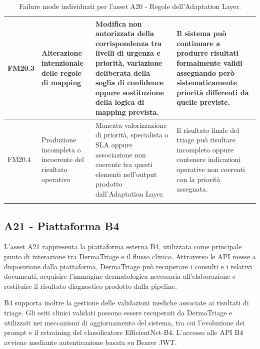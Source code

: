 {\begin{xltabular}{\textwidth}{
    >{\raggedright\arraybackslash}p{1.1cm}
    >{\raggedright\arraybackslash}p{3cm}
    >{\raggedright\arraybackslash}p{5cm}
    X
}
        \midrule

        FM20.3 \hypertarget{fm20-3}{} &
        Alterazione intenzionale delle regole di mapping &
        Modifica non autorizzata della corrispondenza tra livelli di
        urgenza e priorità, variazione deliberata della soglia di
        confidence oppure sostituzione della logica di mapping prevista. &
        Il sistema può continuare a produrre risultati formalmente validi
        assegnando però sistematicamente priorità differenti da quelle
        previste. \\

        \midrule


        FM20.4 \hypertarget{fm20-4}{} &
        Produzione incompleta o incoerente del risultato operativo &
        Mancata valorizzazione di priorità, specialista o SLA oppure
        associazione non coerente tra questi elementi nell'output
        prodotto dall'Adaptation Layer. &
        Il risultato finale del triage può risultare incompleto oppure
        contenere indicazioni operative non coerenti con la priorità
        assegnata. \\

        \bottomrule

    \caption{Failure mode individuati per l'asset A20 - Regole dell'Adaptation Layer.}
    \label{tab:a20-failure-modes}
\end{xltabular}
}


\subsection{A21 - Piattaforma B4}
L'asset A21 rappresenta la piattaforma esterna B4, utilizzata come principale punto di interazione tra DermaTriage e il flusso clinico. Attraverso le API messe a disposizione dalla piattaforma, DermaTriage può recuperare i consulti e i relativi documenti, acquisire l'immagine dermatologica necessaria all'elaborazione e restituire il risultato diagnostico prodotto dalla pipeline.

B4 supporta inoltre la gestione delle validazioni mediche associate ai risultati di triage. Gli esiti clinici validati possono essere recuperati da DermaTriage e utilizzati nei meccanismi di aggiornamento del sistema,
tra cui l'evoluzione dei prompt e il retraining del classificatore EfficientNet-B4. L'accesso alle API B4 avviene mediante autenticazione basata su Bearer JWT.

